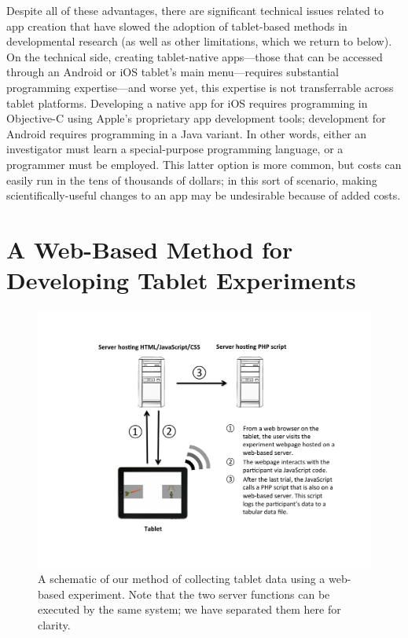 \documentclass[man,noapacite]{apa2}
\begin{document}
Despite all of these advantages, there are significant technical issues related to app creation that have slowed the adoption of tablet-based methods in developmental research (as well as other limitations, which we return to below). On the technical side, creating tablet-native apps---those that can be accessed through an Android or iOS tablet's main menu---requires substantial programming expertise---and worse yet, this expertise is not transferrable across tablet platforms. Developing a native app for iOS requires programming in Objective-C using Apple's proprietary app development tools; development for Android requires programming in a Java variant. In other words, either an investigator must learn a special-purpose programming language, or a programmer must be employed. This latter option is more common, but costs can easily run in the tens of thousands of dollars; in this sort of scenario, making scientifically-useful changes to an app may be undesirable because of added costs. 


\section{A Web-Based Method for Developing Tablet Experiments}


\begin{figure}[t] 
  \begin{center} 
    \includegraphics[width=4.5in]{figures/diagram.pdf} 
    \caption{\label{fig:diagram} A schematic of our method of collecting tablet data using a web-based experiment. Note that the two server functions can be executed by the same system; we have separated them here for clarity.}
  \end{center} 
\end{figure}
\end{document}
